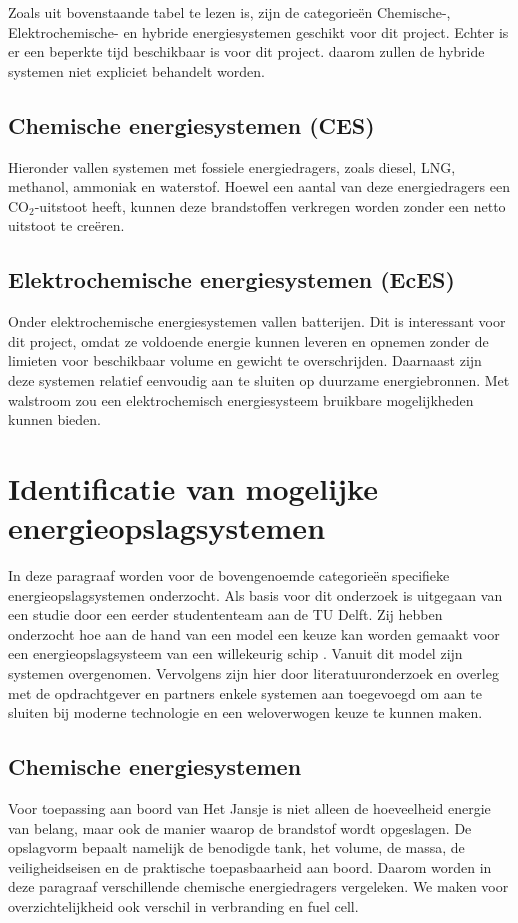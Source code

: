 \noindent Zoals uit bovenstaande tabel te lezen is, zijn de categorieën Chemische-, Elektrochemische- en hybride energiesystemen geschikt voor dit project. Echter is er een beperkte tijd beschikbaar is voor dit project. daarom zullen de hybride systemen niet expliciet behandelt worden.

\subsection{Chemische energiesystemen (CES)}
Hieronder vallen systemen met fossiele energiedragers, zoals diesel, LNG, methanol, ammoniak en waterstof. Hoewel een aantal van deze energiedragers een CO$_2$-uitstoot heeft, kunnen deze brandstoffen verkregen worden zonder een netto uitstoot te creëren.

\subsection{Elektrochemische energiesystemen (EcES)}
Onder elektrochemische energiesystemen vallen batterijen. Dit is interessant voor dit project, omdat ze voldoende energie kunnen leveren en opnemen zonder de limieten voor beschikbaar volume en gewicht te overschrijden. Daarnaast zijn deze systemen relatief eenvoudig aan te sluiten op duurzame energiebronnen. Met walstroom zou een elektrochemisch energiesysteem bruikbare mogelijkheden kunnen bieden.

\section{Identificatie van mogelijke energieopslagsystemen}
In deze paragraaf worden voor de bovengenoemde categorieën specifieke energieopslagsystemen onderzocht. Als basis voor dit onderzoek is uitgegaan van een studie door een eerder studententeam aan de TU Delft. Zij hebben onderzocht hoe aan de hand van een model een keuze kan worden gemaakt voor een energieopslagsysteem van een willekeurig schip \cite{BEPmodelexcel}. Vanuit dit model zijn systemen overgenomen. Vervolgens zijn hier door literatuuronderzoek en overleg met de opdrachtgever en partners enkele systemen aan toegevoegd om aan te sluiten bij moderne technologie en een weloverwogen keuze te kunnen maken.

\subsection{Chemische energiesystemen}
Voor toepassing aan boord van Het Jansje is niet alleen de hoeveelheid energie 
van belang, maar ook de manier waarop de brandstof wordt opgeslagen. De 
opslagvorm bepaalt namelijk de benodigde tank, het volume, de massa, de 
veiligheidseisen en de praktische toepasbaarheid aan boord. Daarom worden in 
deze paragraaf verschillende chemische energiedragers vergeleken. We maken voor overzichtelijkheid ook verschil in verbranding en fuel cell.

